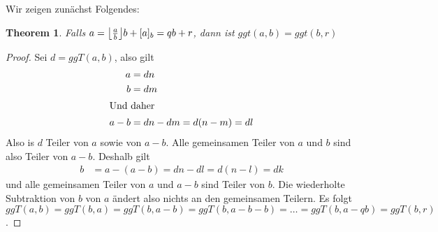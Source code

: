 \documentclass{../crypto}
\newtheorem{theorem}{Theorem}
\begin{document}

%
%
%

\subsection{}

Wir zeigen zunächst Folgendes:

\begin{theorem}
Falls $a = \floor*{\frac{a}{b}}b + [a]_b = qb + r$, dann
   ist $ggt(a,b) = ggt(b,r)$
\end{theorem}
\begin{proof}
   Sei $d=ggT(a,b)$, also gilt
   \begin{align*}
      a & = dn \\
      b & = dm \\
      \intertext{Und daher}
      a - b & = dn - dm  = d(n-m) = dl
   \end{align*}
   Also is $d$ Teiler von $a$ sowie von $a-b$. Alle gemeinsamen Teiler von $a$
   und $b$ sind also Teiler von $a-b$. Deshalb gilt
   \begin{align*}
      b & = a - (a - b) = dn - dl = d(n - l) = dk
   \end{align*}
   und alle gemeinsamen Teiler von $a$ und $a-b$ sind Teiler von $b$. Die
   wiederholte Subtraktion von $b$ von $a$ ändert also nichts an den gemeinsamen
   Teilern. Es folgt $ggT(a,b) = ggT(b,a) = ggT(b, a - b) = ggT(b, a - b - b) =
   \ldots = ggT(b, a - qb) = ggT(b,r)$.
\end{proof}
\end{document}
